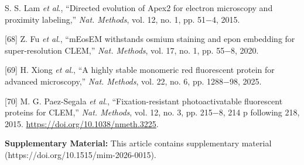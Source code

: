 \documentclass{article}
\begin{document}
\begin{hangpars}
[67] S. S. Lam \emph{et al}., “Directed evolution of Apex2 for electron microscopy and proximity labeling,” \emph{Nat. Methods}, vol. 12, no. 1, pp. 51−4, 2015.

[68] Z. Fu \emph{et al}., “mEosEM withstands osmium staining and epon embedding for super-resolution CLEM,” \emph{Nat. Methods}, vol. 17, no. 1, pp. 55−8, 2020.

[69] H. Xiong \emph{et al}., “A highly stable monomeric red fluorescent protein for advanced microscopy,” \emph{Nat. Methods}, vol. 22, no. 6, pp. 1288−98, 2025.

[70] M. G. Paez-Segala \emph{et al}., “Fixation-resistant photoactivatable fluorescent proteins for CLEM,” \emph{Nat. Methods}, vol. 12, no. 3, pp. 215−8, 214 p following 218, 2015. \url{https://doi.org/10.1038/nmeth.3225}.
\end{hangpars}

\bigskip
\noindent \textbf{Supplementary Material:} This article contains supplementary material (https://doi.org/10.1515/mim-2026-0015).
\end{document}

